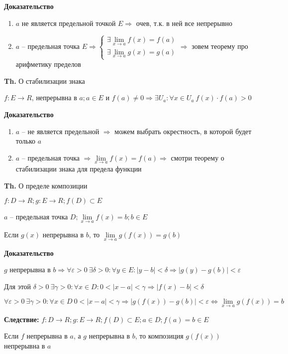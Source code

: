 \documentclass[14pt, letter paper]{article}
\begin{document}
\begin{center}
    \textbf{Доказательство}
\end{center}

\begin{enumerate}
    \item $a$ не является предельной точкой $E \Rightarrow$ очев, т.к. в ней все непрерывно
    \item $a$ -- предельная точка $E \Rightarrow \begin{cases}
        \exists \lim\limits_{x \rightarrow a}{f(x)} = f(a) \\
        \exists \lim\limits_{x \rightarrow a}{g(x)} = g(a)
    \end{cases} \Rightarrow$ зовем теорему про арифметику пределов
\end{enumerate}

\textbf{Th.} О стабилизации знака

$f : E \rightarrow R$, непрерывна в $a; a \in E$ и $f(a) \neq 0 \Rightarrow \exists U_a : \forall x \in U_a\ f(x) \cdot f(a) > 0$

\begin{center}
    \textbf{Доказательство}
\end{center}

\begin{enumerate}
    \item $a$ -- не является предельной $\Rightarrow$ можем выбрать окрестность, в которой будет только $a$

    \item $a$ -- предельная точка $\Rightarrow \lim\limits_{x \rightarrow a}{f(x)} = f(a) \Rightarrow$ смотри теорему о стабилизации знака для предела функции
\end{enumerate}

\textbf{Th.} О пределе композиции

$f : D \rightarrow R; g : E \rightarrow R; f(D) \subset E$

$a$ -- предельная точка $D; \lim\limits_{x \rightarrow a}{f(x)} = b; b \in E$

Если $g(x)$ непрерывна в $b$, то $\lim\limits_{x \rightarrow a}{g(f(x))} = g(b)$

\begin{center}
    \textbf{Доказательство}
\end{center}

$g$ непрерывна в $b \Rightarrow \forall \varepsilon > 0\ \exists \delta > 0 : \forall y \in E : |y - b| < \delta \Rightarrow |g(y) - g(b)| < \varepsilon$

Для этой $\delta > 0\ \exists \gamma > 0 : \forall x \in D : 0 < |x-a| < \gamma \Rightarrow |f(x) - b| < \delta$

$\forall \varepsilon > 0\ \exists \gamma > 0 : \forall x \in D\ 0 < |x-a| < \gamma \Rightarrow |g(f(x)) - g(b)| < \varepsilon \Leftrightarrow \lim\limits_{x \rightarrow a}{g(f(x))} = b$

\textbf{Следствие:} $f : D \rightarrow R; g : E \rightarrow R; f(D) \subset E; a \in D; f(a) = b \in E$

Если $f$ непрерывна в $a$, а $g$ непрерывна в $b$, то композиция $g(f(x))$ непрерывна в $a$
\end{document}
